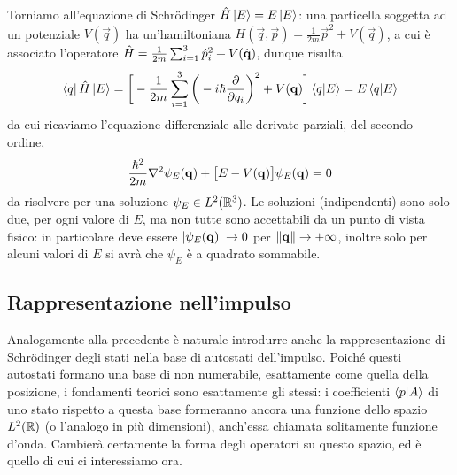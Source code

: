 Torniamo all'equazione di Schr\"odinger $\hat{H}\left|{E}\right\rangle=E\left|{E}\right\rangle$: una particella soggetta ad un potenziale $V(\vec q)$ ha un'hamiltoniana $H(\vec q,\vec p)=\frac1{2m}\vec p^2+V(\vec q)$, a cui è associato l'operatore $\hat{H}=\frac1{2m}\sum_{i=1}^3\hat{p}_i^2+V(\hat{\mathbf{q}})$, dunque risulta
\begin{equation}
	\left\langle{q}\right|\hat{H}\left|{E}\right\rangle=\bigg[-\frac1{2m}\sum_{i=1}^3\bigg(-i\hbar\frac{\partial {}}{\partial {q_i}}\bigg)^2+V(\mathbf{q})\bigg]\left\langle{q}\middle|{E}\right\rangle=E\left\langle{q}\middle|{E}\right\rangle
	\label{eq:hamiltoniano-coordinate}
\end{equation}
da cui ricaviamo l'equazione differenziale alle derivate parziali, del secondo ordine,
\begin{equation}
	\frac{\hbar^2}{2m}\nabla^2\psi_E(\mathbf{q})+\big[E-V(\mathbf{q})\big]\psi_E(\mathbf{q})=0
	\label{eq:schroedinger}
\end{equation}
da risolvere per una soluzione $\psi_E\in L^2(\mathbb{R}^3)$.
Le soluzioni (indipendenti) sono solo due, per ogni valore di $E$, ma non tutte sono accettabili da un punto di vista fisico: in particolare deve essere $\left|{\psi_E(\mathbf{q})}\right|\to 0$ per $\left\|{\mathbf{q}}\right\|\to+\infty$, inoltre solo per alcuni valori di $E$ si avrà che $\psi_E$ è a quadrato sommabile.

\subsection{Rappresentazione nell'impulso}
Analogamente alla precedente è naturale introdurre anche la rappresentazione di Schr\"odinger degli stati nella base di autostati dell'impulso.
Poich\'e questi autostati formano una base di non numerabile, esattamente come quella della posizione, i fondamenti teorici sono esattamente gli stessi: i coefficienti $\left\langle{p}\middle|{A}\right\rangle$ di uno stato rispetto a questa base formeranno ancora una funzione dello spazio $L^2(\mathbb{R})$ (o l'analogo in più dimensioni), anch'essa chiamata solitamente funzione d'onda.
Cambierà certamente la forma degli operatori su questo spazio, ed è quello di cui ci interessiamo ora.

